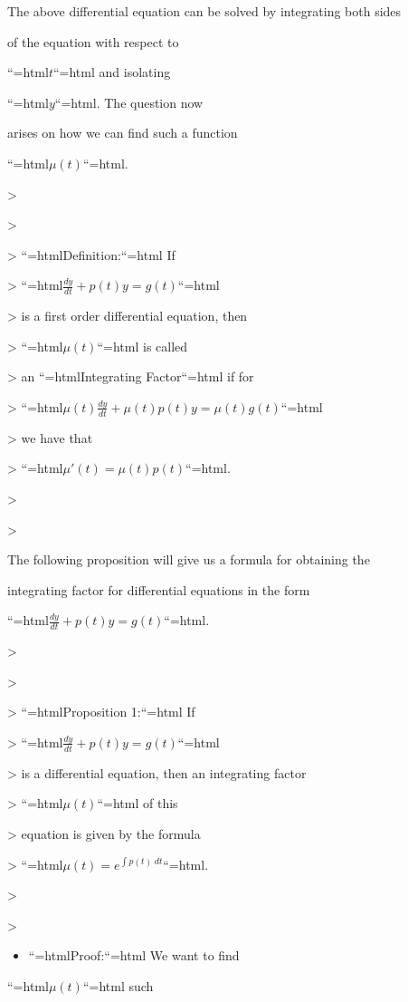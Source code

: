 The above differential equation can be solved by integrating both sides

of the equation with respect to

``{=html}$t$``{=html} and isolating

``{=html}$y$``{=html}. The question now

arises on how we can find such a function

``{=html}$\mu (t)$``{=html}.



> 

>

> ``{=html}Definition:``{=html} If

> ``{=html}$\frac{dy}{dt} + p(t) y = g(t)$``{=html}

> is a first order differential equation, then

> ``{=html}$\mu (t)$``{=html} is called

> an ``{=html}Integrating Factor``{=html} if for

> ``{=html}$\mu (t) \frac{dy}{dt} + \mu (t) p(t) y = \mu (t) g(t)$``{=html}

> we have that

> ``{=html}$\mu ' (t) = \mu (t) p(t)$``{=html}.

>

> 



The following proposition will give us a formula for obtaining the

integrating factor for differential equations in the form

``{=html}$\frac{dy}{dt} + p(t) y = g(t)$``{=html}.



> 

>

> ``{=html}Proposition 1:``{=html} If

> ``{=html}$\frac{dy}{dt} + p(t) y = g(t)$``{=html}

> is a differential equation, then an integrating factor

> ``{=html}$\mu (t)$``{=html} of this

> equation is given by the formula

> ``{=html}$\mu (t) = e^{\int p(t) \; dt}$``{=html}.

>

> 



\begin{itemize}
    \item ``{=html}Proof:``{=html} We want to find
\end{itemize}
    ``{=html}$\mu (t)$``{=html} such

